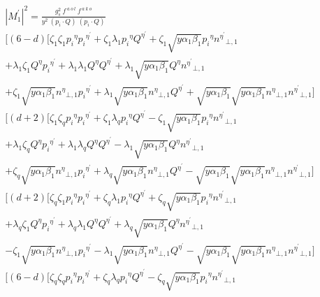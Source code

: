 \begin{equation}
\begin{split}
{|{M}^{\prime}_1|}^2 =\frac{g_s^2 \:f^{\:a\:o\:l}\: f^{\:a\:k\:o}}{y^2\:(p_i\cdot Q) \:(p_i\cdot Q)} \\
[(6-d)[\zeta_1 \zeta_1 {p_i}^{\eta}{p_i}^{{\eta}^{\prime}}+\zeta_1 \lambda_1{p_i}^{\eta}{Q}^{{\eta}^{\prime}}+\zeta_1\sqrt{y\alpha_1\beta_1}{p_i}^{\eta}{n^{{\eta}^{\prime}}}_{\bot,1}\\
+\lambda_1\zeta_1 {Q}^{\eta}{p_i}^{{\eta}^{\prime}}+\lambda_1\lambda_1{Q}^{\eta}{Q}^{{\eta}^{\prime}}+\lambda_1\sqrt{y\alpha_1\beta_1}{Q}^{\eta}{n^{{\eta}^{\prime}}}_{\bot,1}\\
+\zeta_1\sqrt{y\alpha_1\beta_1} {n^{{\eta}}}_{\bot,1}{p_i}^{{\eta}^{\prime}}+\lambda_1\sqrt{y\alpha_1\beta_1}{n^{{\eta}}}_{\bot,1}{Q}^{{\eta}^{\prime}}+\sqrt{y\alpha_1\beta_1}\sqrt{y\alpha_1\beta_1}{n^{{\eta}}}_{\bot,1}{n^{{\eta}^{\prime}}}_{\bot,1}]\\
[(d+2)[\zeta_1 \zeta_q {p_i}^{\eta}{p_i}^{{\eta}^{\prime}}+\zeta_1 \lambda_q{p_i}^{\eta}{Q}^{{\eta}^{\prime}}-\zeta_1\sqrt{y\alpha_1\beta_1}{p_i}^{\eta}{n^{{\eta}^{\prime}}}_{\bot,1}\\
+\lambda_1\zeta_q {Q}^{\eta}{p_i}^{{\eta}^{\prime}}+\lambda_1\lambda_q{Q}^{\eta}{Q}^{{\eta}^{\prime}}-\lambda_1\sqrt{y\alpha_1\beta_1}{Q}^{\eta}{n^{{\eta}^{\prime}}}_{\bot,1}\\
+\zeta_q\sqrt{y\alpha_1\beta_1} {n^{{\eta}}}_{\bot,1}{p_i}^{{\eta}^{\prime}}+\lambda_q\sqrt{y\alpha_1\beta_1}{n^{{\eta}}}_{\bot,1}{Q}^{{\eta}^{\prime}}-\sqrt{y\alpha_1\beta_1}\sqrt{y\alpha_1\beta_1}{n^{{\eta}}}_{\bot,1}{n^{{\eta}^{\prime}}}_{\bot,1}]\\
[(d+2)[\zeta_q \zeta_1 {p_i}^{\eta}{p_i}^{{\eta}^{\prime}}+\zeta_q \lambda_1{p_i}^{\eta}{Q}^{{\eta}^{\prime}}+\zeta_q\sqrt{y\alpha_1\beta_1}{p_i}^{\eta}{n^{{\eta}^{\prime}}}_{\bot,1}\\
+\lambda_q\zeta_1 {Q}^{\eta}{p_i}^{{\eta}^{\prime}}+\lambda_q\lambda_1{Q}^{\eta}{Q}^{{\eta}^{\prime}}+\lambda_q\sqrt{y\alpha_1\beta_1}{Q}^{\eta}{n^{{\eta}^{\prime}}}_{\bot,1}\\
-\zeta_1\sqrt{y\alpha_1\beta_1} {n^{{\eta}}}_{\bot,1}{p_i}^{{\eta}^{\prime}}-\lambda_1\sqrt{y\alpha_1\beta_1}{n^{{\eta}}}_{\bot,1}{Q}^{{\eta}^{\prime}}-\sqrt{y\alpha_1\beta_1}\sqrt{y\alpha_1\beta_1}{n^{{\eta}}}_{\bot,1}{n^{{\eta}^{\prime}}}_{\bot,1}]\\
[(6-d)[\zeta_q \zeta_q {p_i}^{\eta}{p_i}^{{\eta}^{\prime}}+\zeta_q \lambda_q{p_i}^{\eta}{Q}^{{\eta}^{\prime}}-\zeta_q\sqrt{y\alpha_1\beta_1}{p_i}^{\eta}{n^{{\eta}^{\prime}}}_{\bot,1}\\

\end{split}
\end{equation}
